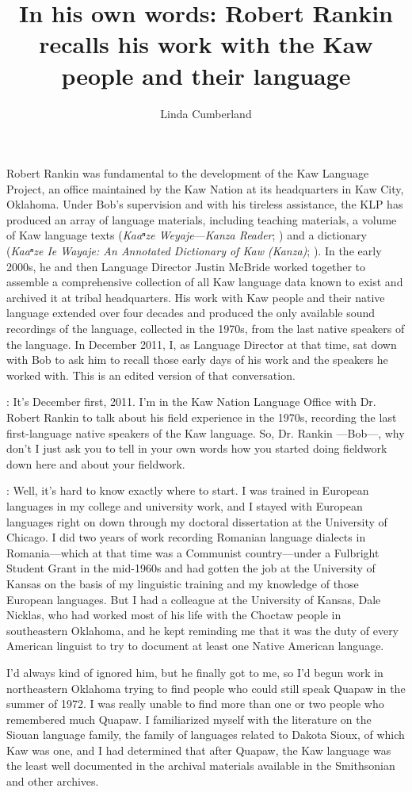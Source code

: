 \documentclass[output=paper]{LSP/langsci}
\author{Linda Cumberland}
\title{In his own words: Robert Rankin recalls his work with the Kaw people and their language}
\begin{document}
Robert Rankin was fundamental to the development of the Kaw Language Project, an office maintained by the Kaw Nation at its headquarters in Kaw City, Oklahoma. Under Bob's supervision and with his tireless assistance, the KLP has produced an array of language materials, including teaching materials, a volume of Kaw language texts (\textit{Kaaⁿze Weyaje}---\textit{Kanza Reader}; \citealt{McBrideEtAl2010}) and a dictionary (\textit{Kaaⁿze Ie Wayaje: An Annotated Dictionary of Kaw (Kanza)}; \citealt{CumberlandEtAl2012}). In the early 2000s, he and then Language Director Justin McBride worked together to assemble a comprehensive collection of all Kaw language data known to exist and archived it at tribal headquarters. His work with Kaw people and their native language extended over four decades and produced the only available sound recordings of the language, collected in the 1970s, from the last native speakers of the language. In December 2011, I, as Language Director at that time, sat down with Bob to ask him to recall those early days of his work and the speakers he worked with. This is an edited version of that conversation.

: It's December first, 2011. I'm in the Kaw Nation Language Office with Dr. Robert Rankin to talk about his field experience in the 1970s, recording the last first-language native speakers of the Kaw language. So, Dr. Rankin ---Bob---, why don't I just ask you to tell in your own words how you started doing fieldwork down here and about your fieldwork.

:  Well, it's hard to know exactly where to start. I was trained in European languages in my college and university work, and I stayed with European languages right on down through my doctoral dissertation at the University of Chicago. I did two years of work recording Romanian language dialects in Romania---which at that time was a Communist country---under a Fulbright Student Grant in the mid-1960s and had gotten the job at the University of Kansas on the basis of my linguistic training and my knowledge of those European languages. But I had a colleague at the University of Kansas, Dale Nicklas, who had worked most of his life with the Choctaw people in southeastern Oklahoma, and he kept reminding me that it was the duty of every American linguist to try to document at least one Native American language. 

I'd always kind of ignored him, but he finally got to me, so I'd begun work in northeastern Oklahoma trying to find people who could still speak Quapaw in the summer of 1972. I was really unable to find more than one or two people who remembered much Quapaw. I familiarized myself with the literature on the Siouan language family, the family of languages related to Dakota Sioux, of which Kaw was one, and I had determined that after Quapaw, the Kaw language was the least well documented in the archival materials available in the Smithsonian and other archives. 
\end{document}
